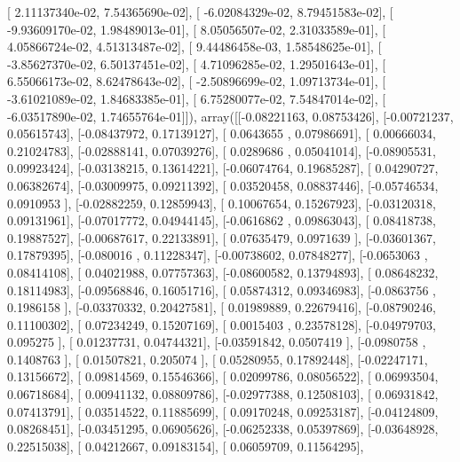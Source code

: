 \documentclass{article}
\begin{document}
       [  2.11137340e-02,   7.54365690e-02],
       [ -6.02084329e-02,   8.79451583e-02],
       [ -9.93609170e-02,   1.98489013e-01],
       [  8.05056507e-02,   2.31033589e-01],
       [  4.05866724e-02,   4.51313487e-02],
       [  9.44486458e-03,   1.58548625e-01],
       [ -3.85627370e-02,   6.50137451e-02],
       [  4.71096285e-02,   1.29501643e-01],
       [  6.55066173e-02,   8.62478643e-02],
       [ -2.50896699e-02,   1.09713734e-01],
       [ -3.61021089e-02,   1.84683385e-01],
       [  6.75280077e-02,   7.54847014e-02],
       [ -6.03517890e-02,   1.74655764e-01]]), array([[-0.08221163,  0.08753426],
       [-0.00721237,  0.05615743],
       [-0.08437972,  0.17139127],
       [ 0.0643655 ,  0.07986691],
       [ 0.00666034,  0.21024783],
       [-0.02888141,  0.07039276],
       [ 0.0289686 ,  0.05041014],
       [-0.08905531,  0.09923424],
       [-0.03138215,  0.13614221],
       [-0.06074764,  0.19685287],
       [ 0.04290727,  0.06382674],
       [-0.03009975,  0.09211392],
       [ 0.03520458,  0.08837446],
       [-0.05746534,  0.0910953 ],
       [-0.02882259,  0.12859943],
       [ 0.10067654,  0.15267923],
       [-0.03120318,  0.09131961],
       [-0.07017772,  0.04944145],
       [-0.0616862 ,  0.09863043],
       [ 0.08418738,  0.19887527],
       [-0.00687617,  0.22133891],
       [ 0.07635479,  0.0971639 ],
       [-0.03601367,  0.17879395],
       [-0.080016  ,  0.11228347],
       [-0.00738602,  0.07848277],
       [-0.0653063 ,  0.08414108],
       [ 0.04021988,  0.07757363],
       [-0.08600582,  0.13794893],
       [ 0.08648232,  0.18114983],
       [-0.09568846,  0.16051716],
       [ 0.05874312,  0.09346983],
       [-0.0863756 ,  0.1986158 ],
       [-0.03370332,  0.20427581],
       [ 0.01989889,  0.22679416],
       [-0.08790246,  0.11100302],
       [ 0.07234249,  0.15207169],
       [ 0.0015403 ,  0.23578128],
       [-0.04979703,  0.095275  ],
       [ 0.01237731,  0.04744321],
       [-0.03591842,  0.0507419 ],
       [-0.0980758 ,  0.1408763 ],
       [ 0.01507821,  0.205074  ],
       [ 0.05280955,  0.17892448],
       [-0.02247171,  0.13156672],
       [ 0.09814569,  0.15546366],
       [ 0.02099786,  0.08056522],
       [ 0.06993504,  0.06718684],
       [ 0.00941132,  0.08809786],
       [-0.02977388,  0.12508103],
       [ 0.06931842,  0.07413791],
       [ 0.03514522,  0.11885699],
       [ 0.09170248,  0.09253187],
       [-0.04124809,  0.08268451],
       [-0.03451295,  0.06905626],
       [-0.06252338,  0.05397869],
       [-0.03648928,  0.22515038],
       [ 0.04212667,  0.09183154],
       [ 0.06059709,  0.11564295],
\end{document}
